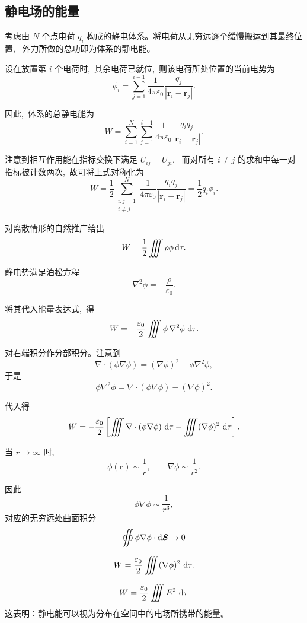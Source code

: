 \subsection{静电场的能量}

考虑由 $N$ 个点电荷 $q_i$ 构成的静电体系。将电荷从无穷远逐个缓慢搬运到其最终位置, \,
外力所做的总功即为体系的静电能。

设在放置第 $i$ 个电荷时, \,其余电荷已就位, \,则该电荷所处位置的当前电势为
\[
\phi_i
=
\sum_{j=1}^{i-1}
\frac{1}{4\pi\varepsilon_0}
\frac{q_j}{|\boldsymbol r_i-\boldsymbol r_j|}.
\]

因此, \,体系的总静电能为
\[
W
=
\sum_{i=1}^{N}\sum_{j=1}^{i-1}
\frac{1}{4\pi\varepsilon_0}
\frac{q_i q_j}{|\boldsymbol r_i-\boldsymbol r_j|}.
\]

注意到相互作用能在指标交换下满足
$U_{ij}=U_{ji}$, \,
而对所有 $i\neq j$ 的求和中每一对指标被计数两次, \,故可将上式对称化为
\[
W
=
\frac12
\sum_{\substack{i,j=1\\ i\neq j}}^{N}
\frac{1}{4\pi\varepsilon_0}
\frac{q_i q_j}{|\boldsymbol r_i-\boldsymbol r_j|}
=
\frac12 q_i \phi_i.
\]


对离散情形的自然推广给出
\[
W
=
\frac{1}{2}\iiint \rho\phi\dif\tau.
\]


静电势满足泊松方程
\[
\nabla^2 \phi = -\frac{\rho}{\varepsilon_0}.
\]

将其代入能量表达式, \,得
\[
W
=
-\frac{\varepsilon_0}{2}\iiint \phi\,\nabla^2\phi\,\dif\tau.
\]

对右端积分作分部积分。注意到
\[
\nabla\cdot(\phi\nabla\phi)
=
(\nabla\phi)^2 + \phi\nabla^2\phi,
\]
于是
\[
\phi\nabla^2\phi
=
\nabla\cdot(\phi\nabla\phi)
-
(\nabla\phi)^2.
\]

代入得
\[
W
=
-\frac{\varepsilon_0}{2}
\left[
\iiint \nabla\cdot(\phi\nabla\phi)\,\dif\tau
-
\iiint (\nabla\phi)^2\,\dif\tau
\right].
\]

当 $r\to\infty$ 时, \,
\[
\phi(\boldsymbol r)\sim \frac{1}{r},\qquad
\nabla\phi\sim \frac{1}{r^2}.
\]

因此
\[
\phi\nabla\phi \sim \frac{1}{r^3},
\]
对应的无穷远处曲面积分
\[
\oiint \phi\nabla\phi\cdot\dif\boldsymbol S\to0
\]

\[
W
=
\frac{\varepsilon_0}{2}\iiint (\nabla\phi)^2\,\dif\tau.
\]

\[
W=\frac{\varepsilon_0}{2}\iiint E^2\,\dif\tau
\]
这表明：静电能可以视为分布在空间中的电场所携带的能量。

